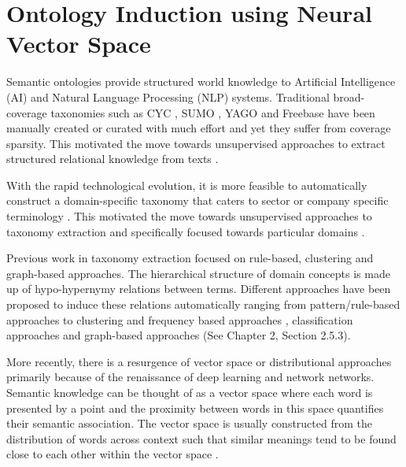 \chapter{Ontology Induction using Neural Vector Space}
\label{chap:ontoinduce}

Semantic ontologies provide structured world knowledge to Artificial Intelligence (AI) and Natural Language Processing (NLP) systems. Traditional broad-coverage taxonomies such as CYC \citep{lenat1995cyc}, SUMO \citep{Pease2002Suggested,Miller1995}, YAGO \citep{Suchanek2007} and Freebase \citep{Bollacker2008} have been manually created or curated with much effort and yet they suffer from coverage sparsity. This motivated the move towards unsupervised approaches to extract structured relational knowledge from texts \citep{lin2001discovery,snow2006semantic,velardi2013ontolearn}.

With the rapid technological evolution, it is more feasible to automatically construct a domain-specific taxonomy that caters to sector or company specific terminology \citep{lefever:2015:SemEval}. This motivated the move towards unsupervised approaches to taxonomy extraction \citep{berland1999finding,lin2001discovery,snow2006semantic} and specifically focused towards particular domains \citep{velardi2013ontolearn,bordea-EtAl:2015:SemEval}. 

Previous work in taxonomy extraction focused on rule-based, clustering and graph-based approaches. The hierarchical structure of domain concepts is made up of hypo-hypernymy relations between terms. Different approaches have been proposed to induce these relations automatically ranging from pattern/rule-based approaches \citep{hearst1992,girju2003automatic,kozareva2008,ceesay-juanhou:2015:SemEval} to clustering and frequency based approaches \citep{lin1998automatic,Caraballo2001,pantelravi2004,grefenstette:2015:SemEval}, classification approaches \citep{snow2004learning,ritter2009anyway,espinosaanke-saggion-ronzano:2015:SemEval} and graph-based approaches \citep{kozareva2010semi,navigliVF11,fountain2012taxonomy,Tuan2014,cleuziou-EtAl:2015:SemEval} (See Chapter 2, Section 2.5.3). 

More recently, there is a resurgence of vector space or distributional approaches \citep{van2005automatic,lenci2012identifying,santus2014} primarily because of the renaissance of deep learning and network networks. Semantic knowledge can be thought of as a vector space where each word is presented by a point and the proximity between words in this space quantifies their semantic association. The vector space is usually constructed from the distribution of words across context such that similar meanings tend to be found close to each other within the vector space \citep{Mitchell:Lapata:2010}. 

